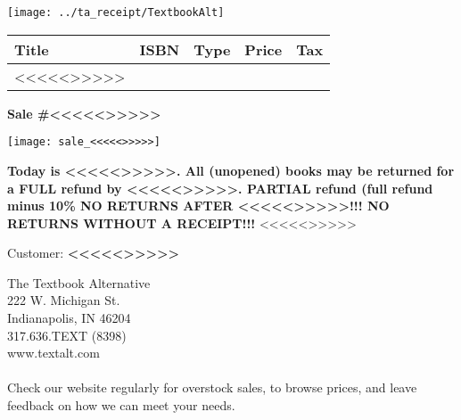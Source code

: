 \documentclass[english]{article}
\providecommand{\tabularnewline}{\\}
\begin{document}
\begin{center}
\texttt{[image: ../ta\_receipt/TextbookAlt]}
\par\end{center}

\vspace{0in}


\begin{center}
\begin{tabular}{|l|c|c|c|c|}
\hline 
\textbf{\large Title} & \textbf{\large ISBN} & \textbf{\large Type} & \textbf{\large Price} & \textbf{\large Tax}\tabularnewline
\hline
\hline
<<<<<>>>>>
\end{tabular}
\par\end{center}

\vspace{0in}


\begin{center}
\textbf{\large Sale \#<<<<<>>>>>}
\par\end{center}{\large \par}

\begin{center}
\texttt{[image: sale\_<<<<<>>>>>]}
\par\end{center}

\vspace{0in}


\textbf{
\hspace{-0.1in} Today is <<<<<>>>>>. \newline
All (unopened) books may be returned for a FULL refund by <<<<<>>>>>. \newline
PARTIAL refund (full refund minus 10\%%
NO RETURNS AFTER <<<<<>>>>>!!! \newline
NO RETURNS WITHOUT A RECEIPT!!! \newline
}
<<<<<>>>>>

{\large Customer: \textbf{<<<<<>>>>>}}


\vspace{0.1in}
The Textbook Alternative \\
222 W. Michigan St. \\
Indianapolis, IN  46204 \\
317.636.TEXT (8398) \\
www.textalt.com \\
\\
Check our website regularly for overstock sales, to browse prices, and leave feedback on how we can meet your needs.
\end{document}
